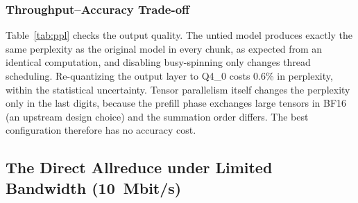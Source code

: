 \documentclass[11pt,a4paper]{article}
\begin{document}
\subsubsection{Throughput--Accuracy Trade-off}\label{sec:n8_7_3}

Table~\ref{tab:ppl} checks the output quality. The untied model produces exactly the same perplexity as the original model in every chunk, as expected from an identical computation, and disabling busy-spinning only changes thread scheduling. Re-quantizing the output layer to Q4\_0 costs 0.6\% in perplexity, within the statistical uncertainty. Tensor parallelism itself changes the perplexity only in the last digits, because the prefill phase exchanges large tensors in BF16 (an upstream design choice) and the summation order differs. The best configuration therefore has no accuracy cost.

\begin{table}[H]
\centering
\caption{Perplexity checks (lower is better). Rows in the same group use the same evaluation text.}
\label{tab:ppl}
\end{table}

\subsection{The Direct Allreduce under Limited Bandwidth (10~Mbit/s)}\label{sec:10mbps}
\end{document}
